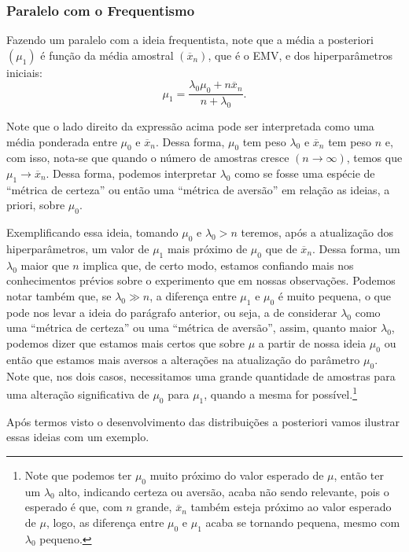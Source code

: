 \documentclass{article}
\begin{document}
\subsubsection*{Paralelo com o Frequentismo}

Fazendo um paralelo com a ideia frequentista, note que a média a posteriori $\left(\mu_1\right)$ é função da média amostral $\left(\overline{x}_n\right)$, que é o EMV, e dos hiperparâmetros iniciais:
\[\mu_1 = \dfrac{\lambda_0\mu_0 + n\overline{x}_n}{n + \lambda_0}.\]

Note que o lado direito da expressão acima pode ser interpretada como uma média ponderada entre $\mu_0$ e $\overline{x}_n$. Dessa forma, $\mu_0$ tem peso $\lambda_0$ e $\overline{x}_n$ tem peso $n$ e, com isso, nota-se que quando o número de amostras cresce $(n \to \infty)$, temos que $\mu_1 \to \overline{x}_n$. Dessa forma, podemos interpretar $\lambda_0$ como se fosse uma espécie de ``métrica de certeza'' ou então uma ``métrica de aversão'' em relação as ideias, a priori, sobre $\mu_0$.

Exemplificando essa ideia, tomando $\mu_0$ e $\lambda_0 > n$ teremos, após a atualização dos hiperparâmetros, um valor de $\mu_1$ mais próximo de $\mu_0$ que de $\overline{x}_n$. Dessa forma, um $\lambda_0$ maior que $n$ implica que, de certo modo, estamos confiando mais nos conhecimentos prévios sobre o experimento que em nossas observações. Podemos notar também que, se $\lambda_0 \gg n$, a diferença entre $\mu_1$ e $\mu_0$ é muito pequena, o que pode nos levar a ideia do parágrafo anterior, ou seja, a de considerar $\lambda_0$ como uma ``métrica de certeza'' ou uma ``métrica de aversão'', assim, quanto maior $\lambda_0$, podemos dizer que estamos mais certos que sobre $\mu$ a partir de nossa ideia $\mu_0$ ou então que estamos mais aversos a alterações na atualização do parâmetro $\mu_0$. Note que, nos dois casos, necessitamos uma grande quantidade de amostras para uma alteração significativa de $\mu_0$ para $\mu_1$, quando a mesma for possível.\footnote{Note que podemos ter $\mu_0$ muito próximo do valor esperado de $\mu$, então ter um $\lambda_0$ alto, indicando certeza ou aversão, acaba não sendo relevante, pois o esperado é que, com $n$ grande, $\overline{x}_n$ também esteja próximo ao valor esperado de $\mu$, logo, as diferença entre $\mu_0$ e $\mu_1$ acaba se tornando pequena, mesmo com $\lambda_0$ pequeno.}

Após termos visto o desenvolvimento das distribuições a posteriori vamos ilustrar essas ideias com um exemplo.
\end{document}
